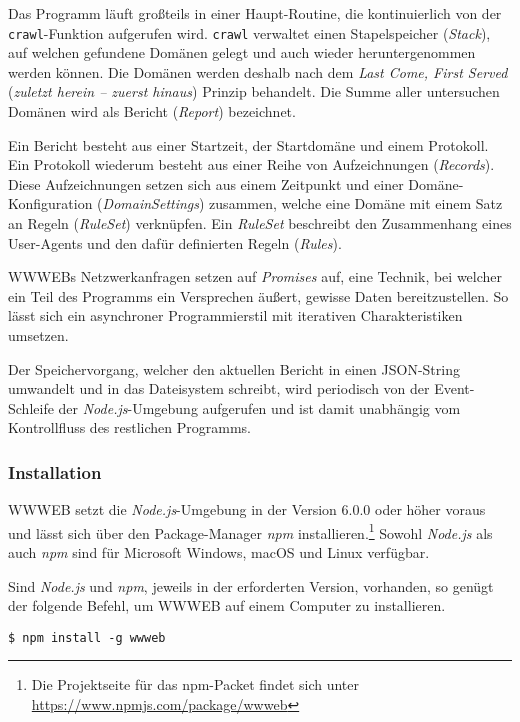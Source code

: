 Das Programm läuft großteils in einer Haupt-Routine, die kontinuierlich von der
\texttt{crawl}-Funktion aufgerufen wird. \texttt{crawl} verwaltet einen
Stapelspeicher (\emph{Stack}), auf welchen gefundene Domänen gelegt und auch
wieder heruntergenommen werden können. Die Domänen werden deshalb nach dem
\emph{Last Come, First Served} (\emph{zuletzt herein -- zuerst hinaus}) Prinzip
behandelt. Die Summe aller untersuchen Domänen wird als Bericht (\emph{Report})
bezeichnet.

Ein Bericht besteht aus einer Startzeit, der Startdomäne und einem Protokoll.
Ein Protokoll wiederum besteht aus einer Reihe von Aufzeichnungen
(\emph{Records}). Diese Aufzeichnungen setzen sich aus einem Zeitpunkt und
einer Domäne-Konfiguration (\emph{DomainSettings}) zusammen, welche eine Domäne
mit einem Satz an Regeln (\emph{RuleSet}) verknüpfen. Ein \emph{RuleSet}
beschreibt den Zusammenhang eines User-Agents und den dafür definierten Regeln
(\emph{Rules}).

WWWEBs Netzwerkanfragen setzen auf \emph{Promises} auf, eine Technik, bei
welcher ein Teil des Programms ein Versprechen äußert, gewisse Daten
bereitzustellen. So lässt sich ein asynchroner Programmierstil mit iterativen
Charakteristiken umsetzen.

Der Speichervorgang, welcher den aktuellen Bericht in einen JSON-String
umwandelt und in das Dateisystem schreibt, wird periodisch von der
Event-Schleife der \emph{Node.js}-Umgebung aufgerufen und ist damit unabhängig
vom Kontrollfluss des restlichen Programms.

\subsubsection{Installation}
\label{ssub:wwweb_installation}

WWWEB setzt die \emph{Node.js}-Umgebung in der Version 6.0.0 oder höher voraus
und lässt sich über den Package-Manager \emph{npm} installieren.\footnote{Die
Projektseite für das npm-Packet findet sich unter
\url{https://www.npmjs.com/package/wwweb}} Sowohl \emph{Node.js} als auch
\emph{npm} sind für Microsoft Windows, macOS und Linux verfügbar.

Sind \emph{Node.js} und \emph{npm}, jeweils in der erforderten Version,
vorhanden, so genügt der folgende Befehl, um WWWEB auf einem Computer zu
installieren.

\begin{lstlisting}[language=shell]
$ npm install -g wwweb
\end{lstlisting}

